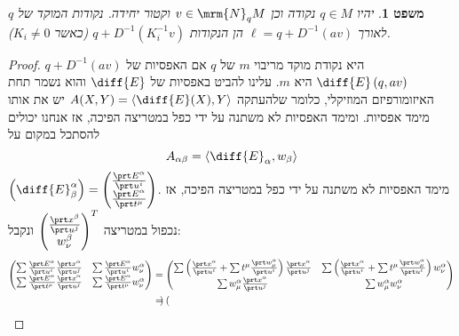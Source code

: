 \documentclass{article}
\newtheorem{theorem}{משפט}
\theoremstyle{definition}
\begin{document}
	\begin{theorem}\label{focal-curvature}
		יהיו
		\(q\in M\)
		נקודה וכן
		\(v\in\mrm{N}_q M\)
		וקטור יחידה.
		נקודות המוקד של \(q\) לאורך
		\(\ell = q+D^{-1}(av)\)
		הן הנקודות
		\(q + D^{-1}(K_i^{-1} v)\)
		(כאשר \(K_i\neq 0\)).
	\end{theorem}

	\begin{proof}
		\(q+D^{-1}(av)\)
		היא נקודת מוקד מריבוי \(m\) של \(q\) אם האפסיות של
		\(\diff{E}\left(q,av\right)\)
		היא \(m\).
		עלינו להביט באפסיות של
		\(\diff{E}\)
		והוא נשמר תחת האיזומורפיזם המוזיקלי, כלומר שלהעתקה
		\(A(X,Y)=\left\langle \diff{E}(X),Y \right\rangle\)
		יש את אותו מימד אפסיות.
		ומימד האפסיות לא משתנה על ידי כפל במטריצה הפיכה, אז אנחנו יכולים להסתכל במקום על
		\[
			A_{\alpha\beta}
			= \left\langle \diff{E}_\alpha, w_\beta \right\rangle
		\]
		\(
			\left(\diff{E}^\alpha_\beta\right)
			= \begin{pmatrix}
				\frac{\prt E^\alpha}{\prt u^i}
				\\ \frac{\prt E^\alpha}{\prt t^\mu}
			\end{pmatrix}
		\).
		מימד האפסיות לא משתנה על ידי כפל במטריצה הפיכה, אז נכפול במטריצה
		\(
			\begin{pmatrix}
				\frac{\prt x^\beta}{\prt u^j}
				\\ w^\beta_\nu
			\end{pmatrix}^T
		\)
		ונקבל:
		\begin{equation*}\begin{split}
			\begin{pmatrix}
				\sum \frac{\prt E^\alpha}{\prt u^i} \frac{\prt x^\alpha}{\prt u^j}
				& \sum \frac{\prt E^\alpha}{\prt u^i} w^\alpha_\nu
				\\
				\sum \frac{\prt E^\alpha}{\prt t^\mu} \frac{\prt x^\alpha}{\prt u^j}
				& \sum \frac{\prt E^\alpha}{\prt t^\mu} w^\alpha_\nu
			\end{pmatrix}
			&= 
			\begin{pmatrix}
				\sum \left(\frac{\prt x^\alpha}{\prt u^i} + \sum t^\mu \frac{\prt w_\mu^\alpha}{\prt u^i}\right) \frac{\prt x^\alpha}{\prt u^j}
				& \sum \left(\frac{\prt x^\alpha}{\prt u^i} + \sum t^\mu \frac{\prt w_\mu^\alpha}{\prt u^i}\right) w^\alpha_\nu
				\\
				\sum w^\alpha_\mu \frac{\prt x^\alpha}{\prt u^j}
				& \sum w^\alpha_\mu w^\alpha_\nu
			\end{pmatrix}
			\\&= 
			\begin{pmatrix}

\end{pmatrix}
\end{split}
\end{equation*}
\end{proof}
\end{document}
